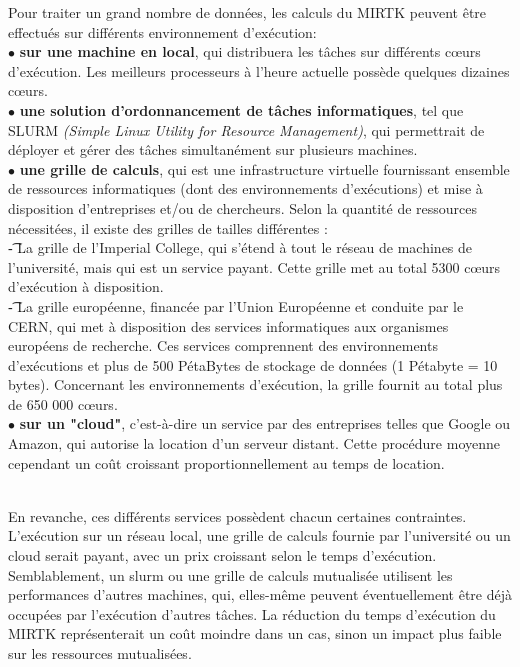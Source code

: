 \documentclass[10pt]{report}
\begin{document}
	Pour traiter un grand nombre de données, les calculs du MIRTK peuvent être effectués sur différents environnement d'exécution: %
	\\{$\bullet$}\textbf{ sur une machine en local}, %
	qui distribuera les tâches sur différents cœurs d'exécution. Les meilleurs processeurs à l'heure actuelle possède quelques dizaines cœurs.  
	\\{$\bullet$}\textbf{ une solution d'ordonnancement de tâches informatiques}, tel que SLURM \textit{(Simple Linux Utility for Resource Management)}, qui permettrait de déployer et gérer des tâches simultanément sur plusieurs machines. 
	\\{$\bullet$}\textbf{ une grille de calculs}, qui est une infrastructure virtuelle fournissant ensemble de ressources informatiques (dont des environnements d'exécutions) et mise à disposition d'entreprises et/ou de chercheurs. Selon la quantité de ressources nécessitées, il existe des grilles de tailles différentes : \\%
	\t - La grille de l'Imperial College, qui s'étend à tout le réseau de machines de l'université, mais qui est un service payant. Cette grille met au total 5300 cœurs d'exécution à disposition.\\
	\t - La grille européenne, financée par l'Union Européenne et conduite par le CERN, qui met à disposition des services informatiques aux organismes européens de recherche. Ces services comprennent des environnements d'exécutions et plus de 500 PétaBytes de stockage de données (1 Pétabyte = 10 bytes). Concernant les environnements d'exécution, la grille fournit au total plus de 650 000 cœurs.
	\\{$\bullet$}\textbf{ sur un "cloud"}, c'est-à-dire un service par des entreprises telles que Google ou Amazon, qui autorise la location d'un serveur distant. Cette procédure moyenne cependant un coût croissant proportionnellement au temps de location.\\ ~\par
	En revanche, ces différents services possèdent chacun certaines contraintes. L'exécution sur un réseau local, une grille de calculs fournie par l'université ou un cloud serait payant, avec un prix croissant selon le temps d'exécution. Semblablement, un slurm ou une grille de calculs mutualisée utilisent les performances d'autres machines, qui, elles-même peuvent éventuellement être déjà occupées par l'exécution d'autres tâches. La réduction du temps d'exécution du MIRTK représenterait un coût moindre dans un cas, sinon un impact plus faible sur les ressources mutualisées.\\ ~\par
\end{document}
